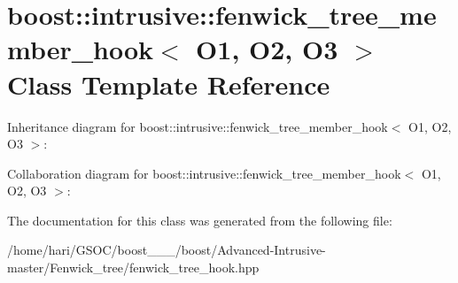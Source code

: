 \hypertarget{classboost_1_1intrusive_1_1fenwick__tree__member__hook}{}\section{boost\+:\+:intrusive\+:\+:fenwick\+\_\+tree\+\_\+member\+\_\+hook$<$ O1, O2, O3 $>$ Class Template Reference}
\label{classboost_1_1intrusive_1_1fenwick__tree__member__hook}


Inheritance diagram for boost\+:\+:intrusive\+:\+:fenwick\+\_\+tree\+\_\+member\+\_\+hook$<$ O1, O2, O3 $>$\+:


Collaboration diagram for boost\+:\+:intrusive\+:\+:fenwick\+\_\+tree\+\_\+member\+\_\+hook$<$ O1, O2, O3 $>$\+:


The documentation for this class was generated from the following file\+:\begin{DoxyCompactItemize}
\item 
/home/hari/\+G\+S\+O\+C/boost\+\_\+\_\+\_/boost/\+Advanced-\/\+Intrusive-\/master/\+Fenwick\+\_\+tree/fenwick\+\_\+tree\+\_\+hook.\+hpp\end{DoxyCompactItemize}
